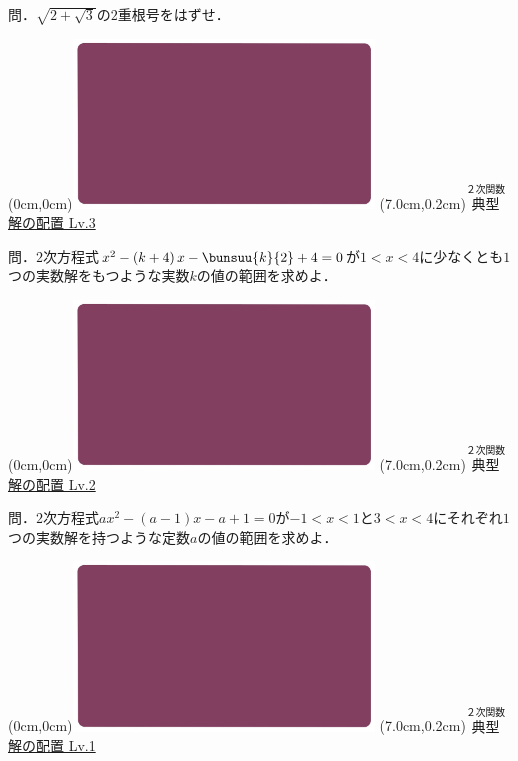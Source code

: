 \documentclass[10pt,
fleqn,
dvipdfmx,
uplatex
]{jsarticle}
\begin{document}
\huge 
問．$\sqrt {2+\sqrt 3}$の$2$重根号をはずせ．


\newpage



\at(0cm,0cm){\includegraphics[width=8cm,bb=0 0 1920 1080]{./youtube/thumbnails/templates/smart_background/２次関数.jpeg}}
\at(7.0cm,0.2cm){\small\color{bradorange}$\overset{\text{２次関数}}{\text{典型}}$}
{\color{orange}\huge\underline{解の配置 Lv.3 }}\vspace{0.3zw}

\Large 
問．$2$次方程式$x^2-\left(k+4\right)x-\bunsuu{k}{2}+4=0$が$1<x<4$に少なくとも$1$つの実数解をもつような実数$k$の値の範囲を求めよ．


\newpage



\at(0cm,0cm){\includegraphics[width=8cm,bb=0 0 1920 1080]{./youtube/thumbnails/templates/smart_background/２次関数.jpeg}}
\at(7.0cm,0.2cm){\small\color{bradorange}$\overset{\text{２次関数}}{\text{典型}}$}
{\color{orange}\huge\underline{解の配置 Lv.2 }}\vspace{0.3zw}

\Large 
問．$2$次方程式$ax^2-\left(a-1\right)x-a+1=0$が$-1<x<1$と$3<x<4$にそれぞれ$1$つの実数解を持つような定数$a$の値の範囲を求めよ．


\newpage



\at(0cm,0cm){\includegraphics[width=8cm,bb=0 0 1920 1080]{./youtube/thumbnails/templates/smart_background/２次関数.jpeg}}
\at(7.0cm,0.2cm){\small\color{bradorange}$\overset{\text{２次関数}}{\text{典型}}$}
{\color{orange}\huge\underline{解の配置 Lv.1 }}\vspace{0.3zw}
\end{document}
